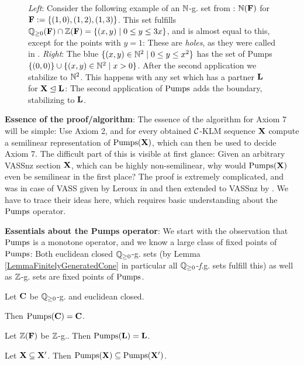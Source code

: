 \begin{figure}[h!]
\begin{minipage}{4.5cm}
\end{minipage}%

\caption{\textit{Left}: Consider the following example of an \(\mathbb{N}\)-g. set from \cite{GuttenbergRE23}: \(\mathbb{N}(\mathbf{F})\) for \(\mathbf{F}:=\{(1,0), (1,2), (1,3)\}\). This set fulfills \(\mathbb{Q}_{\geq 0}(\mathbf{F}) \cap \mathbb{Z}(\mathbf{F})=\{(x,y) \mid 0 \leq y \leq 3x\}\), and is almost equal to this, except for the points with \(y=1\): These are \emph{holes}, as they were called in \cite{GuttenbergRE23}. \newline
\textit{Right}: The blue \(\{(x,y) \in \mathbb{N}^2 \mid 0 \leq y \leq x^2\}\) has the set of Pumps \(\{(0,0)\} \cup \{(x,y) \in \mathbb{N}^2 \mid x>0\}\). After the second application we stabilize to \(\mathbb{N}^2\). This happens with any set which has a partner \(\mathbf{L}\) for \(\mathbf{X} \trianglelefteq \mathbf{L}\): The second application of \(\operatorname{Pumps}\) adds the boundary, stabilizing to \(\mathbf{L}\).}\label{FigureIntuitionDoublePumps}
\end{figure}

\textbf{Essence of the proof/algorithm}: The essence of the algorithm for Axiom 7 will be simple: Use Axiom 2, and for every obtained \(\mathcal{C}\)-KLM sequence \(\mathbf{X}\) compute a semilinear representation of \(\operatorname{Pumps}(\mathbf{X})\), which can then be used to decide Axiom 7. The difficult part of this is visible at first glance: Given an arbitrary VASSnz section \(\mathbf{X}\), which can be highly non-semilinear, why would \(\operatorname{Pumps}(\mathbf{X})\) even be semilinear in the first place? The proof is extremely complicated, and was in case of VASS given by Leroux in \cite{Leroux13} and then extended to VASSnz by \cite{Guttenberg24}. We have to trace their ideas here, which requires basic understanding about the \(\operatorname{Pumps}\) operator.

\textbf{Essentials about the Pumps operator}: We start with the observation that \(\operatorname{Pumps}\) is a monotone operator, and we know a large class of fixed points of \(\operatorname{Pumps}\): Both euclidean closed \(\mathbb{Q}_{\geq 0}\)-g. sets (by Lemma \ref{LemmaFinitelyGeneratedCone} in particular all \(\mathbb{Q}_{\geq 0}\)-\emph{f}.g. sets fulfill this) as well as \(\mathbb{Z}\)-g. sets are fixed points of \(\operatorname{Pumps}\).

\begin{lemma} \label{LemmaObviousPropertiesOfPumps}
Let \(\mathbf{C}\) be \(\mathbb{Q}_{\geq 0}\)-g. and euclidean closed. 

Then \(\operatorname{Pumps}(\mathbf{C})=\mathbf{C}\).

Let \(\mathbb{Z}(\mathbf{F})\) be \(\mathbb{Z}\)-g.. Then \(\operatorname{Pumps}(\mathbf{L})=\mathbf{L}\).

Let \(\mathbf{X} \subseteq \mathbf{X}'\). Then \(\operatorname{Pumps}(\mathbf{X}) \subseteq \operatorname{Pumps}(\mathbf{X}')\). 
\end{lemma}


